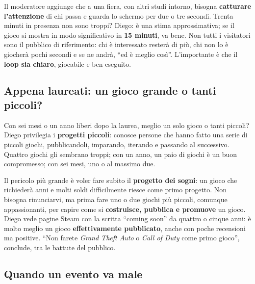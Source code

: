 Il moderatore aggiunge che a una fiera, con altri studi intorno, bisogna
\textbf{catturare l'attenzione} di chi passa e guarda lo schermo per due o tre
secondi. Trenta minuti in presenza non sono troppi? Diego: è una stima
approssimativa; se il gioco si mostra in modo significativo in \textbf{15 minuti},
va bene. Non tutti i visitatori sono il pubblico di riferimento: chi è interessato
resterà di più, chi non lo è giocherà pochi secondi e se ne andrà, ``ed è meglio
così''. L'importante è che il \textbf{loop sia chiaro}, giocabile e ben eseguito.

\subsection{Appena laureati: un gioco grande o tanti piccoli?}

Con sei mesi o un anno liberi dopo la laurea, meglio un solo gioco o tanti piccoli?
Diego privilegia i \textbf{progetti piccoli}: conosce persone che hanno fatto una
serie di piccoli giochi, pubblicandoli, imparando, iterando e passando al successivo.
Quattro giochi gli sembrano troppi; con un anno, un paio di giochi è un buon
compromesso; con sei mesi, uno o al massimo due.

Il pericolo più grande è voler fare subito il \textbf{progetto dei sogni}: un gioco
che richiederà anni e molti soldi difficilmente riesce come primo progetto. Non
bisogna rinunciarvi, ma prima fare uno o due giochi più piccoli, comunque
appassionanti, per capire come si \textbf{costruisce, pubblica e promuove} un gioco.
Diego vede pagine Steam con la scritta ``coming soon'' da quattro o cinque anni: è
molto meglio un gioco \textbf{effettivamente pubblicato}, anche con poche recensioni
ma positive. ``Non farete \emph{Grand Theft Auto} o \emph{Call of Duty} come primo
gioco'', conclude, tra le battute del pubblico.

\subsection{Quando un evento va male}

